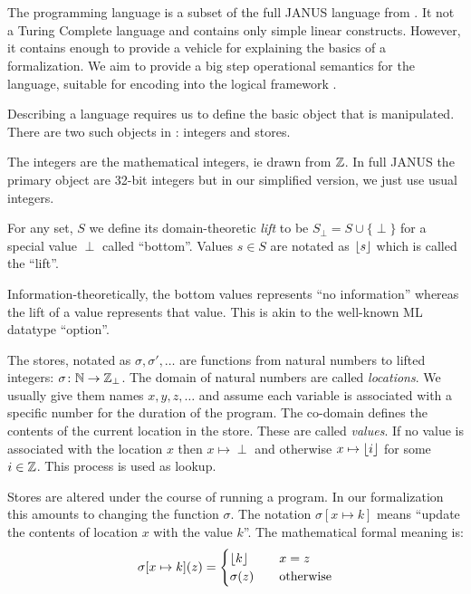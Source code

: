 \chapter{\janusz{}}

The \janusz{} programming language is a subset of the full JANUS
language from \cite{glueck2007}. It not a Turing Complete language and
contains only simple linear constructs. However, it contains enough to
provide a vehicle for explaining the basics of a formalization. We aim
to provide a big step operational semantics for the language, suitable
for encoding into the logical framework \coq{}.

Describing a language requires us to define the basic object that is
manipulated. There are two such objects in \janusz{}: integers and
stores.

The integers are the mathematical integers, ie drawn from $\mathbb{Z}$. In
full JANUS the primary object are 32-bit integers but in our
simplified version, we just use usual integers.
\begin{defn}
  \label{defn-lift}
  For any set, $S$ we define its domain-theoretic \emph{lift} to be
  $S_{\perp} = S \cup \{\perp\} $ for a special value $\perp$ called
  ``bottom''. Values $s \in S$ are notated as $\lfloor s \rfloor$ which is
  called the ``lift''.
\end{defn}
Information-theoretically, the bottom values represents ``no
information'' whereas the lift of a value represents that value. This
is akin to the well-known ML datatype ``option''.

The stores, notated as $\sigma, \sigma', \dotsc$ are functions from
natural numbers to lifted integers: $\sigma \colon \mathbb{N} \to
\mathbb{Z}_{\perp}$. The domain of natural numbers are called
\emph{locations}. We usually give them names $x, y, z, \dotsc$ and
assume each variable is associated with a specific number for the
duration of the program. The co-domain defines the contents of the
current location in the store. These are called \emph{values}. If no
value is associated with the location $x$ then $x \mapsto \perp$ and
otherwise $x \mapsto \lfloor i \rfloor$ for some $i \in \mathbb{Z}$. This process is
used as lookup.

Stores are altered under the course of running a program. In our
formalization this amounts to changing the function
$\sigma$. The notation $\sigma[x \mapsto k]$ means ``update the contents
of location $x$ with the value $k$''. The mathematical formal meaning
is:
\begin{equation*}
  \sigma[x \mapsto k](z) = \begin{cases}
    \lfloor k \rfloor & \quad x = z\\
    \sigma(z)  & \quad \text{otherwise}
  \end{cases}
\end{equation*}

